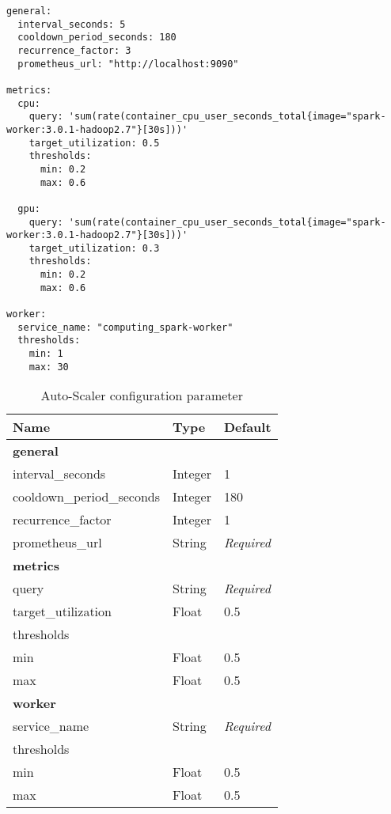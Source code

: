 \begin{lstlisting}[label=lst:06_auto-scaler_config_example, caption=Auto-Scaler configuration YAML file]
general:
  interval_seconds: 5
  cooldown_period_seconds: 180
  recurrence_factor: 3
  prometheus_url: "http://localhost:9090"
 
metrics:
  cpu:
    query: 'sum(rate(container_cpu_user_seconds_total{image="spark-worker:3.0.1-hadoop2.7"}[30s]))'
    target_utilization: 0.5
    thresholds:
      min: 0.2
      max: 0.6
  
  gpu:
    query: 'sum(rate(container_cpu_user_seconds_total{image="spark-worker:3.0.1-hadoop2.7"}[30s]))'
    target_utilization: 0.3
    thresholds:
      min: 0.2
      max: 0.6
 
worker:
  service_name: "computing_spark-worker"
  thresholds:
    min: 1
    max: 30
\end{lstlisting}


\begin{table}[]
\centering
\begin{tabular}{@{}lll@{}}
\toprule
Name                      & Type    & Default           \\ \midrule
\multicolumn{3}{l}{\textbf{general}}                    \\ \midrule
interval\_seconds         & Integer & 1                 \\
cooldown\_period\_seconds & Integer & 180               \\
recurrence\_factor        & Integer & 1                 \\
prometheus\_url           & String  & \textit{Required} \\
\multicolumn{3}{l}{\textbf{metrics}}                    \\ \midrule
query                     & String  & \textit{Required} \\
target\_utilization       & Float   & 0.5               \\
\multicolumn{3}{l}{thresholds}                          \\
min                       & Float   & 0.5               \\
max                       & Float   & 0.5               \\
\multicolumn{3}{l}{\textbf{worker}}                     \\ \midrule
service\_name             & String  & \textit{Required} \\
\multicolumn{3}{l}{thresholds}                          \\
min                       & Float   & 0.5               \\
max                       & Float   & 0.5               \\ \bottomrule
\end{tabular}
\caption{Auto-Scaler configuration parameter}
\label{table:06_auto-scaler_config_parameter}
\end{table}


